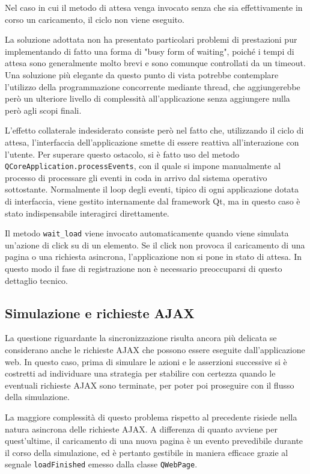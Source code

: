 Nel caso in cui il metodo di attesa venga invocato senza che sia effettivamente in corso un caricamento, il ciclo non viene eseguito.

La soluzione adottata non ha presentato particolari problemi di prestazioni pur implementando di fatto una forma di "busy form of waiting", poiché i tempi di attesa sono generalmente molto brevi e sono comunque controllati da un timeout. Una soluzione più elegante da questo punto di vista potrebbe contemplare l'utilizzo della programmazione concorrente mediante thread, che aggiungerebbe però un ulteriore livello di complessità all'applicazione senza aggiungere nulla però agli scopi finali.

L'effetto collaterale indesiderato consiste però nel fatto che, utilizzando il ciclo di attesa, l'interfaccia dell'applicazione smette di essere reattiva all'interazione con l'utente. Per superare questo ostacolo, si è fatto uso del metodo \newline \verb|QCoreApplication.processEvents|, con il quale si impone manualmente al processo di processare gli eventi in coda in arrivo dal sistema operativo sottostante. Normalmente il loop degli eventi, tipico di ogni applicazione dotata di interfaccia, viene gestito internamente dal framework Qt, ma in questo caso è stato indispensabile interagirci direttamente.

Il metodo \verb|wait_load| viene invocato automaticamente quando viene simulata un'azione di click su di un elemento. Se il click non provoca il caricamento di una pagina o una richiesta asincrona, l'applicazione non si pone in stato di attesa. In questo modo il fase di registrazione non è necessario preoccuparsi di questo dettaglio tecnico.

\subsection{Simulazione e richieste AJAX}

La questione riguardante la sincronizzazione risulta ancora più delicata se considerano anche le richieste AJAX che possono essere eseguite dall'applicazione web. In questo caso, prima di simulare le azioni e le asserzioni successive si è costretti ad individuare una strategia per stabilire con certezza quando le eventuali richieste AJAX sono terminate, per poter poi proseguire con il flusso della simulazione. 

La maggiore complessità di questo problema rispetto al precedente risiede nella natura asincrona delle richieste AJAX. A differenza di quanto avviene per quest'ultime, il caricamento di una nuova pagina è un evento prevedibile durante il corso della simulazione, ed è pertanto gestibile in maniera efficace grazie al segnale \verb|loadFinished| emesso dalla classe \verb|QWebPage|. 

